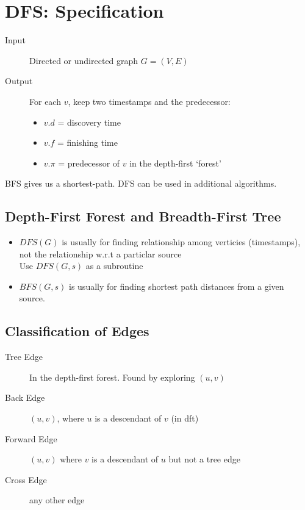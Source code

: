 \documentclass{article}
\begin{document}
\section*{DFS: Specification}

\begin{description}
    \item[Input]  Directed or undirected graph \(G = (V, E)\)
    \item[Output] For each \(v\), keep two timestamps and the predecessor:
        \begin{itemize}
            \item \(v.d\) = discovery time
            \item \(v.f\) = finishing time
            \item \(v.\pi\) = predecessor of \(v\) in the depth-first `forest'
        \end{itemize}
\end{description}

BFS gives us a shortest-path.
DFS can be used in additional algorithms.


\subsection*{Depth-First Forest and Breadth-First Tree}
\begin{itemize}
    \item \(DFS(G)\) is usually for finding relationship among verticies (timestamps), not the relationship w.r.t a particlar source \\
          Use \(DFS(G, s)\) as a subroutine
    \item \(BFS(G, s)\) is usually for finding shortest path distances from a given source.
\end{itemize}

\subsection*{Classification of Edges}
\begin{description}
    \item[Tree Edge] In the depth-first forest. Found by exploring \((u, v)\)
    \item[Back Edge] \((u, v)\), where \(u\) is a descendant of \(v\) (in dft)
    \item[Forward Edge] \((u, v)\) where \(v\) is a descendant of \(u\) but not a tree edge
    \item[Cross Edge] any other edge
\end{description}
\end{document}
